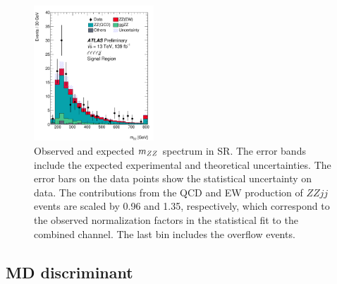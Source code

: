 \begin{figure}[!htbp]
\begin{center}
\includegraphics[width=0.4\textwidth]{figures/VBSZZ/fit/MZZ_4l_SR.pdf}
\end{center}
\caption{Observed and expected $m_{ZZ}$ spectrum in SR.
        The error bands include the expected experimental and theoretical uncertainties.
        The error bars on the data points show the statistical uncertainty on data.
        The contributions from the QCD and EW production of $ZZjj$ events are scaled by 0.96 and 1.35, respectively,
        which correspond to the observed normalization factors in the statistical fit to the combined channel.
        The last bin includes the overflow events.
        }
\label{fig:scaled_mzz}
\end{figure}

\subsection{MD discriminant}

